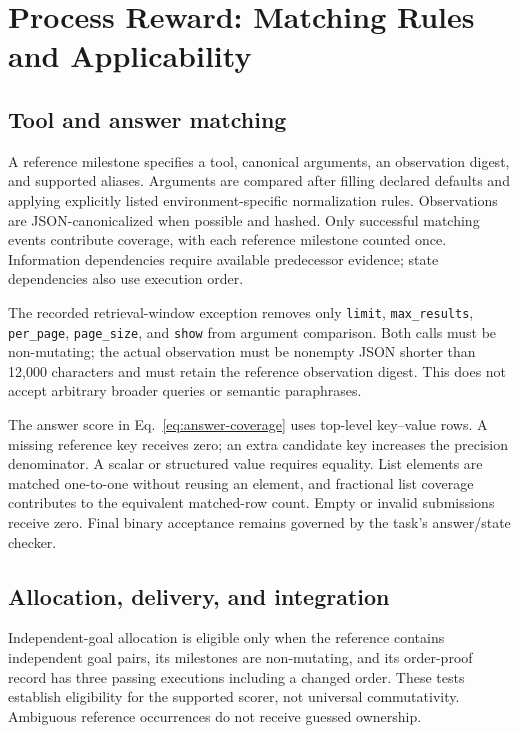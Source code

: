 \section{Process Reward: Matching Rules and Applicability}
\label{app:process}

\subsection{Tool and answer matching}

A reference milestone specifies a tool, canonical arguments, an observation digest, and supported aliases. Arguments are compared after filling declared defaults and applying explicitly listed environment-specific normalization rules. Observations are JSON-canonicalized when possible and hashed. Only successful matching events contribute coverage, with each reference milestone counted once. Information dependencies require available predecessor evidence; state dependencies also use execution order.

The recorded retrieval-window exception removes only \texttt{limit}, \texttt{max\_results}, \texttt{per\_page}, \texttt{page\_size}, and \texttt{show} from argument comparison. Both calls must be non-mutating; the actual observation must be nonempty JSON shorter than 12,000 characters and must retain the reference observation digest. This does not accept arbitrary broader queries or semantic paraphrases.

The answer score in Eq.~\ref{eq:answer-coverage} uses top-level key--value rows. A missing reference key receives zero; an extra candidate key increases the precision denominator. A scalar or structured value requires equality. List elements are matched one-to-one without reusing an element, and fractional list coverage contributes to the equivalent matched-row count. Empty or invalid submissions receive zero. Final binary acceptance remains governed by the task's answer/state checker.

\subsection{Allocation, delivery, and integration}

Independent-goal allocation is eligible only when the reference contains independent goal pairs, its milestones are non-mutating, and its order-proof record has three passing executions including a changed order. These tests establish eligibility for the supported scorer, not universal commutativity. Ambiguous reference occurrences do not receive guessed ownership.

